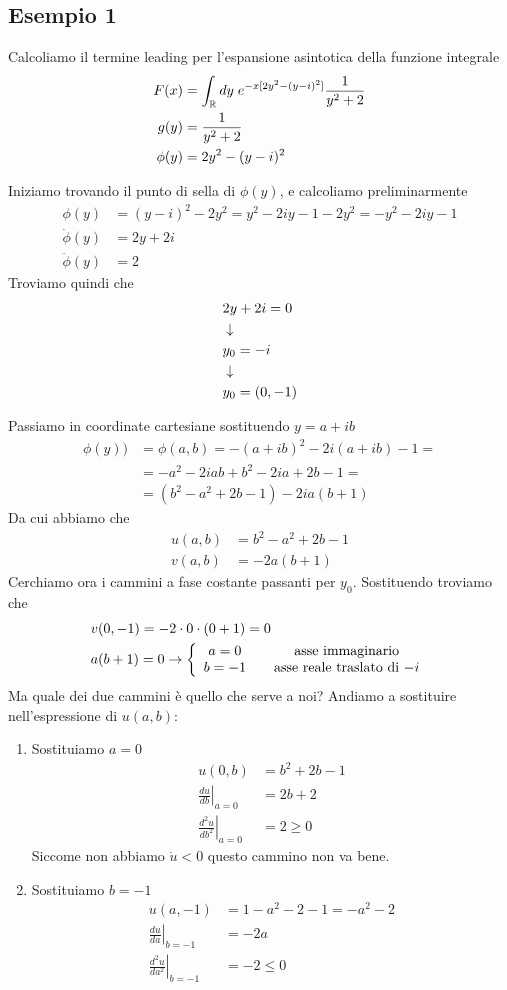 \subsection{Esempio 1}

Calcoliamo il termine leading per l'espansione asintotica  della funzione integrale
\begin{align}
	F(x) &= \int_{\mathbb{R}} dy \; e^{-x[2y^2 -(y-i)^2]} \frac{1}{y^2 + 2}\\
	g(y) &=  \frac{1}{y^2 + 2}\\
	\phi(y) &= 2y^2 -(y-i)^2
\end{align}

Iniziamo trovando il punto di sella di $\phi(y)$, e calcoliamo preliminarmente
\begin{align}
	\phi(y) &=  (y-i)^2 -2y^2 = y^2 - 2iy -1 -2y^2 = -y^2 - 2iy -1 \\
	\dot{\phi}(y) &= 2y + 2i\\
	\ddot{\phi}(y) &= 2
\end{align}
Troviamo quindi che
\begin{align}
	&2y + 2i = 0 \\ &\downarrow \nonumber \\
	&y_0=-i\\ &\downarrow \nonumber \\
	&y_0= (0,-1)
\end{align}

Passiamo in coordinate cartesiane sostituendo $y = a+ib$
\begin{align}
	\phi(y)) &= \phi(a,b) = -(a+ib)^2 -2i(a+ib) -1 = \nonumber\\
	&= -a^2 - 2iab + b^2 - 2ia + 2b -1 =   \nonumber\\
	&= (b^2 -a^2 + 2b -1) -2ia(b + 1)
\end{align}
Da cui abbiamo che
\begin{align}
	u(a,b) &= b^2 -a^2 + 2b -1\\
	v(a,b) &= -2a(b + 1)
\end{align}
Cerchiamo ora i cammini a fase costante passanti per $y_0$. Sostituendo troviamo che
\begin{align}
	&v(0,-1) = -2\cdot 0 \cdot (0 + 1) =0\\
	&a(b + 1) = 0 \to \left\{ \begin{array}{cc} a=0 \quad &\text{asse immaginario}\\ b=-1 \quad &\text{asse reale traslato di $-i$} \end{array} \right.
\end{align}
Ma quale dei due cammini è quello che serve a noi? Andiamo a sostituire nell'espressione di $u(a,b)$:
\begin{enumerate}
	\item Sostituiamo $a=0$
	\begin{align}
		u(0,b) &= b^2 + 2b-1 \\
		\left. \frac{d u}{d b} \right|_{a=0} &= 2b + 2 \\ 
		\left. \frac{d^2 u}{d b^2} \right|_{a=0} &= 2 \geq 0  
	\end{align}
	Siccome non abbiamo $\ddot u <0$ questo cammino non va bene.
	\item Sostituiamo $b=-1$
	\begin{align}
		u(a,-1) &= 1 -a^2 -2-1 = -a^2 -2 \\
		\left. \frac{d u}{d a} \right|_{b=-1} &= -2a\\ 
		\left. \frac{d^2 u}{d a^2} \right|_{b=-1} &= -2 \leq 0  
	\end{align}
\end{enumerate}

